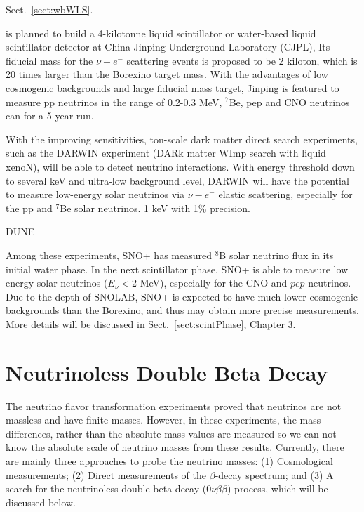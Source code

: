 Sect.~\ref{sect:wbWLS}.

is planned to build a 4-kilotonne liquid scintillator or water-based liquid scintillator detector at China Jinping Underground Laboratory (CJPL), 
Its fiducial mass for the $\nu-e^-$ scattering events is proposed to be 2 kiloton, which is 20 times larger than the Borexino target mass. With the advantages of low cosmogenic backgrounds and large fiducial mass target, Jinping is featured to measure pp neutrinos in the range of 0.2-0.3 MeV, $^7$Be, pep and CNO neutrinos
can for a 5-year run\cite{beacom2017physics}. 

With the improving sensitivities, ton-scale dark matter direct search experiments, such as the DARWIN experiment (DARk matter WImp search with liquid xenoN), will be able to detect neutrino interactions\cite{aalbers2016darwin}. With energy threshold down to several keV and ultra-low background level, DARWIN will have the potential to measure low-energy solar neutrinos via $\nu-e^-$ elastic scattering, especially for the pp and $^7$Be solar neutrinos. 1 keV with 1\% precision\cite{baudis2014neutrino,aalbers2020solar}.

DUNE

Among these experiments, SNO+ has measured $^8$B solar neutrino flux in its initial water phase\cite{anderson2019measurement}. In the next scintillator phase, SNO+ is able to measure low energy solar neutrinos ($E_\nu<2$ MeV), especially for the CNO and $pep$ neutrinos. Due to the depth of SNOLAB, SNO+ is expected to have much lower cosmogenic backgrounds than the Borexino, and thus may obtain more precise measurements\cite{directorReview}. More details will be discussed in Sect.~\ref{sect:scintPhase}, Chapter 3.

\section{Neutrinoless Double Beta Decay}\label{sect:doublebeta}
The neutrino flavor transformation experiments proved that neutrinos are not massless and have finite masses. However, in these experiments, the mass differences, rather than the absolute mass values are measured so we can not know the absolute scale of neutrino masses from these results. Currently, there are mainly three approaches to probe the neutrino masses\cite{valle2015neutrinos}: (1) Cosmological measurements\cite{aghanim2020planck,dvorkin2019neutrino,lesgourgues2013neutrino}; (2) Direct measurements of the $\beta$-decay spectrum; and (3) A search for the neutrinoless double beta decay ($0\nu\beta\beta$) process, which will be discussed below.


